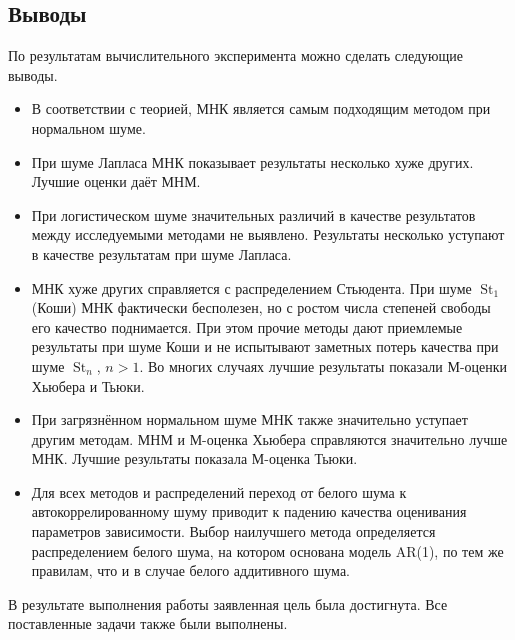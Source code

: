 \documentclass[12pt,a4paper]{article}
\newcommand{\Studentlaw}{\operatorname{St}}
\begin{document}
	\newpage
	\begin{center}
		\section{Выводы}
	\end{center}
	
	По результатам вычислительного эксперимента можно сделать следующие выводы.
	\begin{itemize}
		\item В соответствии с теорией, МНК является самым подходящим методом при нормальном шуме.
		\item При шуме Лапласа МНК показывает результаты несколько хуже других. Лучшие оценки даёт МНМ.
		\item При логистическом шуме значительных различий в качестве результатов между исследуемыми методами не выявлено. Результаты несколько уступают в качестве результатам при шуме Лапласа.
		\item МНК хуже других справляется с распределением Стьюдента. При шуме $\Studentlaw_1$ (Коши) МНК фактически бесполезен, но с ростом числа степеней свободы его качество поднимается. При этом прочие методы дают приемлемые результаты при шуме Коши и не испытывают заметных потерь качества при шуме $\Studentlaw_n$, $n > 1$. Во многих случаях лучшие результаты показали М-оцен\-ки Хьюбера и Тьюки.
		\item При загрязнённом нормальном шуме МНК также значительно уступает другим методам. МНМ и М-оценка Хьюбера справляются значительно лучше МНК. Лучшие результаты показала М-оценка Тьюки.
		\item Для всех методов и распределений переход от белого шума к автокоррелированному шуму приводит к падению качества оценивания параметров зависимости. Выбор наилучшего метода определяется распределением белого шума, на котором основана модель AR(1), по тем же правилам, что и в случае белого аддитивного шума.
	\end{itemize}
	В результате выполнения работы заявленная цель была достигнута. Все поставленные задачи также были выполнены.
	
\end{document}
